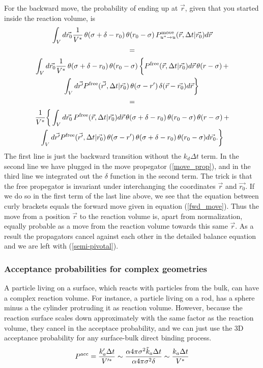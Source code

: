 For the backward move, the probability of ending up at $\vec{r}$, given that you started inside the reaction volume, is
\begin{multline}
\int_{V} d\vec{r_0} \frac{1}{V^*} \, \theta(\sigma + \delta - r_0) \, \theta(r_0 - \sigma) \, P^{\rm move}_{u^* \rightarrow u}(\vec{r},\Delta t|\vec{r_0})d\vec{r} 
\\ =
\\ \int_{V} d\vec{r_0} \frac{1}{V^*} \, \theta(\sigma + \delta - r_0) \, \theta(r_0 - \sigma) \, \bigg\{ P^{\rm free}(\vec{r},\Delta t|\vec{r_0}) d\vec{r} \, \theta(r - \sigma) \, + 
\\ \int_{V} d\vec{r'} P^{\rm free}(\vec{r'},\Delta t|\vec{r_0}) \, \theta(\sigma - r') \, \delta(\vec{r} - \vec{r_0}) d\vec{r} \bigg\} \, 
\\ = 
\\ \frac{1}{V^*} \bigg\{ \int_{V} d\vec{r_0} \, P^{\rm free}(\vec{r},\Delta t|\vec{r_0}) d\vec{r} \, \theta(\sigma + \delta - r_0) \, \theta(r_0 - \sigma) \, \theta(r - \sigma) \, + 
\\ \int_{V} d\vec{r'} P^{\rm free}(\vec{r'},\Delta t|\vec{r_0}) \, \theta(\sigma - r') \, \theta(\sigma + \delta - r_0)  \, \theta(r_0 - \sigma) d\vec{r_0}. \bigg\}
\end{multline}
The first line is just the backward transition without the $k_d \Delta t$ term. In the second line we have plugged in the move propegator (\ref{move_prop}), and in the third line we integrated out the $\delta$ function in the second term. The trick is that the free propegator is invariant under interchanging the coordinates $\vec{r}$ and $\vec{r_0}$. If we do so in the first term of the last line above, we see that the equation between curly brackets equals the forward move given in equation (\ref{fwd_move}). Thus the move from a position $\vec{r}$ to the reaction volume is, apart from normalization, equally probable as a move from the reaction volume towards this same $\vec{r}$. As a result the propagators cancel against each other in the detailed balance equation and we are left with (\ref{semi-pivotal}).

\subsubsection{Acceptance probabilities for complex geometries}

A particle living on a surface, which reacts with particles from the bulk, can have a complex reaction volume. For instance, a particle living on a rod, has a sphere minus a the cylinder protruding it as reaction volume. However, because the reaction surface scales down approximately with the same factor as the reaction volume, they cancel in the acceptace probability, and we can just use the 3D acceptance probability for any surface-bulk direct binding process.
\begin{equation}
 P^{\rm acc} = \frac{k'_a \Delta t}{V'^*} \sim \frac{ \alpha 4 \pi \sigma^2 \tilde{k}_a \Delta t}{\alpha 4 \pi \sigma^2 \delta} \sim \frac{k_a \Delta t}{V^*}
\end{equation}

